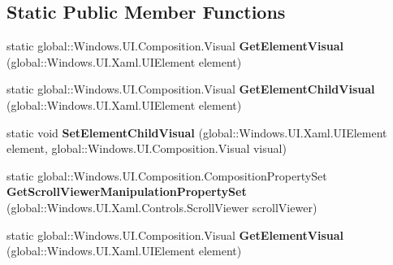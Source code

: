 \subsection*{Static Public Member Functions}
\begin{DoxyCompactItemize}
\item 
\mbox{\label{class_windows_1_1_u_i_1_1_xaml_1_1_hosting_1_1_element_composition_preview_a197394bc43fd737a554e4e888ca99c71}} 
static global\+::\+Windows.\+U\+I.\+Composition.\+Visual {\bfseries Get\+Element\+Visual} (global\+::\+Windows.\+U\+I.\+Xaml.\+U\+I\+Element element)
\item 
\mbox{\label{class_windows_1_1_u_i_1_1_xaml_1_1_hosting_1_1_element_composition_preview_a8187f1a70143d04232934a796b4099ef}} 
static global\+::\+Windows.\+U\+I.\+Composition.\+Visual {\bfseries Get\+Element\+Child\+Visual} (global\+::\+Windows.\+U\+I.\+Xaml.\+U\+I\+Element element)
\item 
\mbox{\label{class_windows_1_1_u_i_1_1_xaml_1_1_hosting_1_1_element_composition_preview_a214faabff7d601f8d727a4b0f000f677}} 
static void {\bfseries Set\+Element\+Child\+Visual} (global\+::\+Windows.\+U\+I.\+Xaml.\+U\+I\+Element element, global\+::\+Windows.\+U\+I.\+Composition.\+Visual visual)
\item 
\mbox{\label{class_windows_1_1_u_i_1_1_xaml_1_1_hosting_1_1_element_composition_preview_a97dcf75bcb6cd9ebb00b1029e9dc2b7d}} 
static global\+::\+Windows.\+U\+I.\+Composition.\+Composition\+Property\+Set {\bfseries Get\+Scroll\+Viewer\+Manipulation\+Property\+Set} (global\+::\+Windows.\+U\+I.\+Xaml.\+Controls.\+Scroll\+Viewer scroll\+Viewer)
\item 
\mbox{\label{class_windows_1_1_u_i_1_1_xaml_1_1_hosting_1_1_element_composition_preview_a197394bc43fd737a554e4e888ca99c71}} 
static global\+::\+Windows.\+U\+I.\+Composition.\+Visual {\bfseries Get\+Element\+Visual} (global\+::\+Windows.\+U\+I.\+Xaml.\+U\+I\+Element element)
\item 

\end{DoxyCompactItemize}
